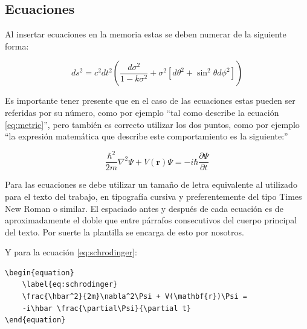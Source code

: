 \subsection{Ecuaciones}
\label{sec:Ecuaciones}

Al insertar ecuaciones en la memoria estas se deben numerar de la siguiente forma:

\begin{equation}
	\label{eq:metric}
	ds^2 = c^2 dt^2 \left( \frac{d\sigma^2}{1-k\sigma^2} + \sigma^2\left[ d\theta^2 + \sin^2\theta d\phi^2 \right] \right)
\end{equation}
                                                        
Es importante tener presente que en el caso de las ecuaciones estas pueden ser referidas por su número, como por ejemplo ``tal como describe la ecuación \ref{eq:metric}'', pero también es correcto utilizar los dos puntos, como por ejemplo ``la expresión matemática que describe este comportamiento es la siguiente:''

\begin{equation}
	\label{eq:schrodinger}
	\frac{\hbar^2}{2m}\nabla^2\Psi + V(\mathbf{r})\Psi = -i\hbar \frac{\partial\Psi}{\partial t}
\end{equation}

Para las ecuaciones se debe utilizar un tamaño de letra equivalente al utilizado para el texto del trabajo, en tipografía cursiva y preferentemente del tipo Times New Roman o similar. El espaciado antes y después de cada ecuación es de aproximadamente el doble que entre párrafos consecutivos del cuerpo principal del texto. Por suerte la plantilla se encarga de esto por nosotros.

Y para la ecuación \ref{eq:schrodinger}:

\begin{verbatim}
\begin{equation}
	\label{eq:schrodinger}
	\frac{\hbar^2}{2m}\nabla^2\Psi + V(\mathbf{r})\Psi = 
	-i\hbar \frac{\partial\Psi}{\partial t}
\end{equation}

\end{verbatim}